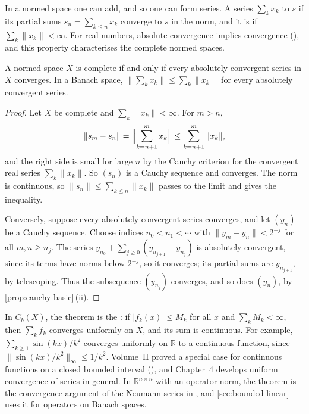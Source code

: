 In a normed space one can add, and so one can form series. A series $\sum_kx_k$  to $s$ if its partial sums $s_n=\sum_{k\le n}x_k$ converge to $s$ in the norm, and it is  if $\sum_k\|x_k\|<\infty$. For real numbers, absolute convergence implies convergence (), and this property characterises the complete normed spaces.

\begin{theorem}
\label{thm:absolute-series}
A normed space $X$ is complete if and only if every absolutely convergent series in $X$ converges. In a Banach space, $\|\sum_kx_k\|\le\sum_k\|x_k\|$ for every absolutely convergent series.
\end{theorem}

\begin{proof}
Let $X$ be complete and $\sum_k\|x_k\|<\infty$. For $m>n$,
\[
\|s_m-s_n\|=\Bigl\|\sum_{k=n+1}^mx_k\Bigr\|\le\sum_{k=n+1}^m\|x_k\| ,
\]
and the right side is small for large $n$ by the Cauchy criterion for the convergent real series $\sum_k\|x_k\|$. So $(s_n)$ is a Cauchy sequence and converges. The norm is continuous, so $\|s_n\|\le\sum_{k\le n}\|x_k\|$ passes to the limit and gives the inequality.

Conversely, suppose every absolutely convergent series converges, and let $(y_n)$ be a Cauchy sequence. Choose indices $n_0<n_1<\cdots$ with $\|y_m-y_n\|<2^{-j}$ for all $m,n\ge n_j$. The series $y_{n_0}+\sum_{j\ge0}(y_{n_{j+1}}-y_{n_j})$ is absolutely convergent, since its terms have norms below $2^{-j}$, so it converges; its partial sums are $y_{n_{j+1}}$, by telescoping. Thus the subsequence $(y_{n_j})$ converges, and so does $(y_n)$, by \cref{prop:cauchy-basic}\,(ii).
\end{proof}

In $C_b(X)$, the theorem is the : if $|f_k(x)|\le M_k$ for all $x$ and $\sum_kM_k<\infty$, then $\sum_kf_k$ converges uniformly on $X$, and its sum is continuous. For example, $\sum_{k\ge1}\sin(kx)/k^2$ converges uniformly on $\mathbb R$ to a continuous function, since $\|\sin(kx)/k^2\|_\infty\le1/k^2$. Volume~II proved a special case for continuous functions on a closed bounded interval (), and Chapter~4 develops uniform convergence of series in general. In $\mathbb R^{n\times n}$ with an operator norm, the theorem is the convergence argument of the Neumann series in , and \cref{sec:bounded-linear} uses it for operators on Banach spaces.

